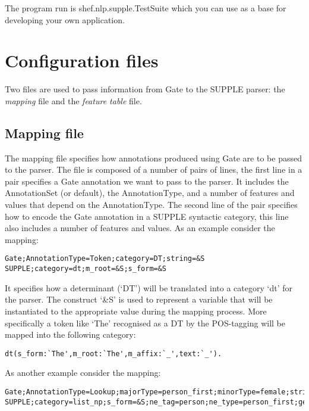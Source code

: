 \documentclass[a4paper,titlepage,openany,twoside]{book}
\begin{document}
The program run is shef.nlp.supple.TestSuite which you can use as a
base for developing your own application.

\chapter{Configuration files}
\label{sec:config}

Two files are used to pass information from Gate to the SUPPLE
parser: the {\em mapping} file and the {\em feature table} file.\\

\section{Mapping file}
The mapping file specifies how annotations produced using Gate 
are to be passed to the parser.   
The file is composed of a number of  pairs of lines, the first line in
a pair specifies a Gate annotation  we want to pass to the parser. It includes the AnnotationSet (or
default), the AnnotationType, and a number of features and values that
depend on the AnnotationType.
The second line of the pair specifies how to encode the Gate
annotation in a SUPPLE syntactic category, this line also
includes a number of features and values.
As an example consider the mapping:

\begin{verbatim}
Gate;AnnotationType=Token;category=DT;string=&S
SUPPLE;category=dt;m_root=&S;s_form=&S
\end{verbatim}


It specifies how a determinant (`DT') will be translated into
a category `dt' for the parser. The construct `\&S' is used to
represent a variable that will be instantiated to the appropriate
value during the mapping process. More specifically a token like `The'
recognised as a DT by the POS-tagging will be mapped into the
following category:

\begin{verbatim}
dt(s_form:`The',m_root:`The',m_affix:`_',text:`_').
\end{verbatim}


As another example consider the mapping:

\begin{verbatim}
Gate;AnnotationType=Lookup;majorType=person_first;minorType=female;string=&S
SUPPLE;category=list_np;s_form=&S;ne_tag=person;ne_type=person_first;gender=female
\end{verbatim}
\end{document}
